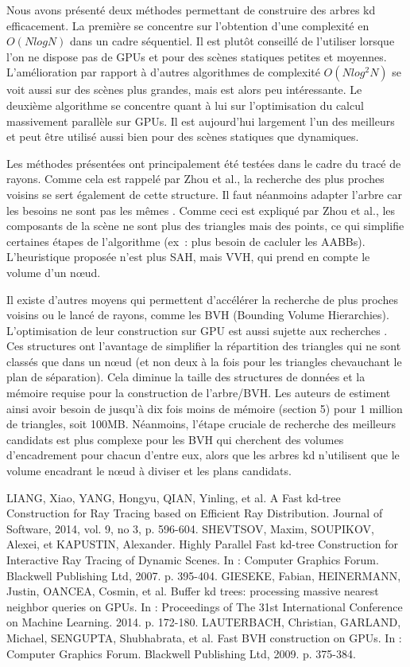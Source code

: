 \documentclass[a4paper]{article}
\begin{document}
Nous avons présenté deux méthodes permettant de construire des arbres kd efficacement. La première se concentre sur l'obtention d'une complexité en $O(NlogN)$ dans un cadre séquentiel. Il est plutôt conseillé de l'utiliser lorsque l'on ne dispose pas de GPUs et pour des scènes statiques petites et moyennes. L'amélioration par rapport à d'autres algorithmes de complexité $O(Nlog^2N)$ se voit aussi sur des scènes plus grandes, mais est alors peu intéressante. Le deuxième algorithme se concentre quant à lui sur l'optimisation du calcul massivement parallèle sur GPUs. Il est aujourd'hui largement l'un des meilleurs et peut être utilisé aussi bien pour des scènes statiques que dynamiques.

Les méthodes présentées ont principalement été testées dans le cadre du tracé de rayons. Comme cela est rappelé par Zhou et al., la recherche des plus proches voisins se sert également de cette structure. Il faut néanmoins adapter l'arbre  car les besoins ne sont pas les mêmes \cite{buffered-kdtree}. Comme ceci est expliqué par Zhou et al., les composants de la scène ne sont plus des triangles mais des points, ce qui simplifie certaines étapes de l'algorithme (ex~: plus besoin de cacluler les AABBs). L'heuristique proposée n'est plus SAH, mais VVH, qui prend en compte le volume d'un nœud.

Il existe d'autres moyens qui permettent d'accélérer la recherche de plus proches voisins ou le lancé de rayons, comme les BVH (Bounding Volume Hierarchies). L'optimisation de leur construction sur GPU est aussi sujette aux recherches \cite{bvh}. Ces structures ont l'avantage de simplifier la répartition des triangles qui ne sont classés que dans un nœud (et non deux à la fois pour les triangles chevauchant le plan de séparation). Cela diminue la taille des structures de données et la mémoire requise pour la construction de l'arbre/BVH. Les auteurs de \cite{bvh} estiment ainsi avoir besoin de jusqu'à dix fois moins de mémoire (section 5) pour 1 million de triangles, soit 100MB. Néanmoins, l'étape cruciale de recherche des meilleurs candidats est plus complexe pour les BVH qui cherchent des volumes d'encadrement pour chacun d'entre eux, alors que les arbres kd n'utilisent que le volume encadrant le nœud à diviser et les plans candidats.

\begin{thebibliography}{1}
	 LIANG, Xiao, YANG, Hongyu, QIAN, Yinling, et al. A Fast kd-tree Construction for Ray Tracing based on Efficient Ray Distribution. Journal of Software, 2014, vol. 9, no 3, p. 596-604.
	 SHEVTSOV, Maxim, SOUPIKOV, Alexei, et KAPUSTIN, Alexander. Highly Parallel Fast kd-tree Construction for Interactive Ray Tracing of Dynamic Scenes. In : Computer Graphics Forum. Blackwell Publishing Ltd, 2007. p. 395-404.
	 GIESEKE, Fabian, HEINERMANN, Justin, OANCEA, Cosmin, et al. Buffer kd trees: processing massive nearest neighbor queries on GPUs. In : Proceedings of The 31st International Conference on Machine Learning. 2014. p. 172-180.
	 LAUTERBACH, Christian, GARLAND, Michael, SENGUPTA, Shubhabrata, et al. Fast BVH construction on GPUs. In : Computer Graphics Forum. Blackwell Publishing Ltd, 2009. p. 375-384.
\end{thebibliography}
\end{document}

